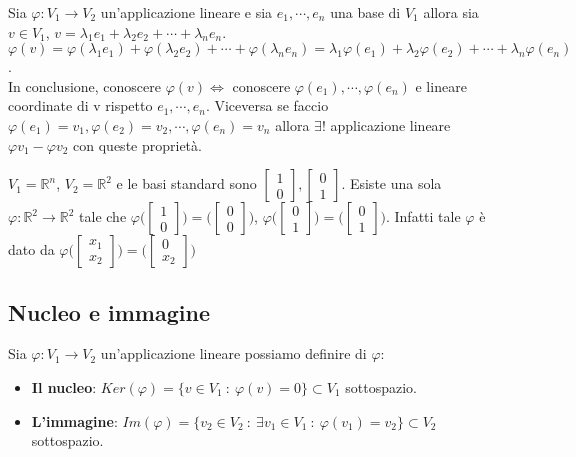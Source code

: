 \hspace{-15pt}Sia $\varphi: V_1 \to V_2$ un'applicazione lineare e sia $e_1, \cdots, e_n$ una base di $V_1$ allora sia $v \in V_1$, $v = \lambda_1 e_1 + \lambda_2 e_2 + \cdots + \lambda_n e_n$. $\varphi(v) = \varphi(\lambda_1 e_1) + \varphi(\lambda_2 e_2) + \cdots + \varphi(\lambda_n e_n) = \lambda_1 \varphi(e_1) + \lambda_2 \varphi(e_2) + \cdots + \lambda_n \varphi(e_n)$.\\
In conclusione, conoscere $\varphi(v) \Longleftrightarrow$ conoscere $\varphi (e_1), \cdots, \varphi (e_n)$ e lineare coordinate di v rispetto $e_1, \cdots, e_n$. Viceversa se faccio $\varphi (e_1) = v_1, \varphi(e_2) = v_2, \cdots, \varphi(e_n) = v_n$ allora $\exists !$ applicazione lineare $\varphi v_1 - \varphi v_2$ con queste proprietà.

\begin{example}
$V_1 = \mathbb{R}^n$, $V_2 = \mathbb{R}^2$ e le basi standard sono $\begin{bmatrix}1\\0\end{bmatrix}, \begin{bmatrix}0\\1\end{bmatrix}$. Esiste una sola $\varphi: \mathbb{R}^2 \to \mathbb{R}^2$ tale che $\varphi \Big(\begin{bmatrix}1\\0\end{bmatrix}\Big) = \Big(\begin{bmatrix}0\\0\end{bmatrix}\Big)$, $\varphi \Big(\begin{bmatrix}0\\1\end{bmatrix}\Big) = \Big(\begin{bmatrix}0\\1\end{bmatrix}\Big)$. Infatti tale $\varphi$ è dato da $\varphi \Big(\begin{bmatrix}x_1\\x_2\end{bmatrix}\Big) = \Big(\begin{bmatrix}0\\x_2\end{bmatrix}\Big)$
\end{example}

\subsection{Nucleo e immagine}
\begin{definition}
Sia $\varphi: V_1 \to V_2$ un'applicazione lineare possiamo definire di $\varphi$:
\begin{itemize}
    \item \textbf{Il nucleo}: $Ker(\varphi) = \{v \in V_1 \::\: \varphi(v) = 0\} \subset V_1$ sottospazio. 
    \item \textbf{L'immagine}: $Im(\varphi) = \{v_2 \in V_2 \::\: \exists v_1 \in V_1 \::\: \varphi(v_1) = v_2\} \subset V_2$ sottospazio.
\end{itemize}
\end{definition}

